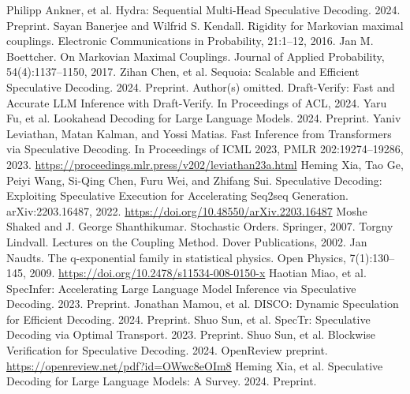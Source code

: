 \begin{thebibliography}{99}
 Philipp Ankner, et al. Hydra: Sequential Multi-Head Speculative Decoding. 2024. Preprint.
 Sayan Banerjee and Wilfrid S. Kendall. Rigidity for Markovian maximal couplings. Electronic Communications in Probability, 21:1--12, 2016.
 Jan M. Boettcher. On Markovian Maximal Couplings. Journal of Applied Probability, 54(4):1137--1150, 2017.
 Zihan Chen, et al. Sequoia: Scalable and Efficient Speculative Decoding. 2024. Preprint.
 Author(s) omitted. Draft-Verify: Fast and Accurate LLM Inference with Draft-Verify. In Proceedings of ACL, 2024.
 Yaru Fu, et al. Lookahead Decoding for Large Language Models. 2024. Preprint.
 Yaniv Leviathan, Matan Kalman, and Yossi Matias. Fast Inference from Transformers via Speculative Decoding. In Proceedings of ICML 2023, PMLR 202:19274--19286, 2023. \url{https://proceedings.mlr.press/v202/leviathan23a.html}
 Heming Xia, Tao Ge, Peiyi Wang, Si-Qing Chen, Furu Wei, and Zhifang Sui. Speculative Decoding: Exploiting Speculative Execution for Accelerating Seq2seq Generation. arXiv:2203.16487, 2022. \url{https://doi.org/10.48550/arXiv.2203.16487}
 Moshe Shaked and J. George Shanthikumar. Stochastic Orders. Springer, 2007.
 Torgny Lindvall. Lectures on the Coupling Method. Dover Publications, 2002.
 Jan Naudts. The q-exponential family in statistical physics. Open Physics, 7(1):130--145, 2009. \url{https://doi.org/10.2478/s11534-008-0150-x}
 Haotian Miao, et al. SpecInfer: Accelerating Large Language Model Inference via Speculative Decoding. 2023. Preprint.
 Jonathan Mamou, et al. DISCO: Dynamic Speculation for Efficient Decoding. 2024. Preprint.
 Shuo Sun, et al. SpecTr: Speculative Decoding via Optimal Transport. 2023. Preprint.
 Shuo Sun, et al. Blockwise Verification for Speculative Decoding. 2024. OpenReview preprint. \url{https://openreview.net/pdf?id=OWwc8eOIm8}
 Heming Xia, et al. Speculative Decoding for Large Language Models: A Survey. 2024. Preprint.
\end{thebibliography}

